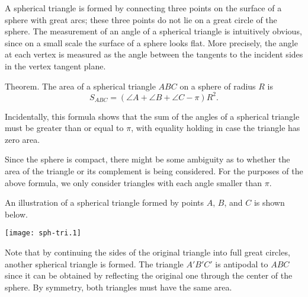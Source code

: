 \documentclass[12pt]{article}
\begin{document}
A spherical triangle is formed by connecting three points on the surface
of a sphere with great arcs; these three points do not lie on a great circle of the sphere. The measurement of an angle of a spherical
triangle is intuitively obvious, since on a small scale the surface of
a sphere looks flat. More precisely, the angle at each vertex is measured as the
angle between the tangents to the incident sides in the vertex tangent plane.

Theorem.
The area of a spherical triangle $ABC$ on a sphere of radius $R$ is
\begin{equation}\label{sph-tri-area}
  S_{ABC} = (\angle A + \angle B + \angle C - \pi) R^2.
\end{equation}

Incidentally, this formula shows that the sum of the angles of a spherical
triangle must be greater than or equal to $\pi$, with equality holding
in case the triangle has zero area.

Since the sphere is compact, there might be some ambiguity as to whether
the area of the triangle or its complement is being considered. For
the purposes of the above formula, we only consider triangles with
each angle smaller than $\pi$.

An illustration of a spherical triangle
formed by points $A$, $B$, and $C$ is shown below.
\begin{center}
  \texttt{[image: sph-tri.1]}
\end{center}
Note that by continuing the sides of the original triangle into full
great circles, another spherical triangle is formed. The triangle $A'B'C'$
is antipodal to $ABC$ since it can be obtained by reflecting the original
one through the center of the sphere. By symmetry, both triangles must
have the same area.
\end{document}
